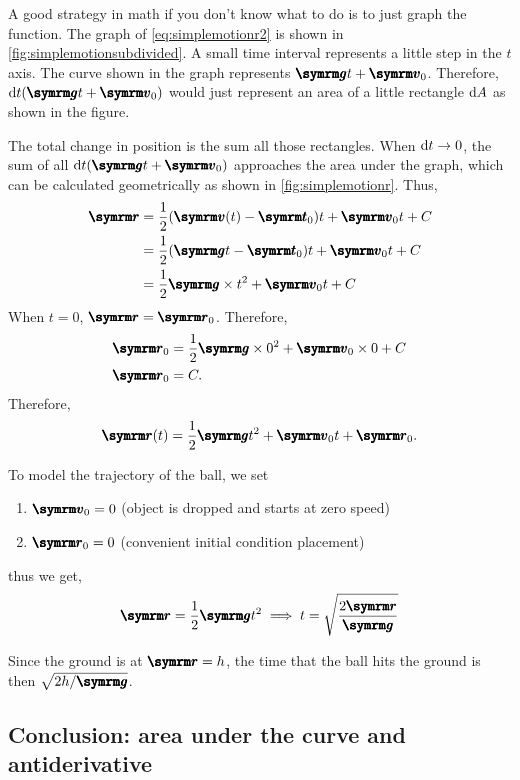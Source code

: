 \begin{multicols}{2}
A good strategy in math if you don't know what to do is to just graph the function. The graph of \cref{eq:simplemotionr2} is shown in \cref{fig:simplemotionsubdivided}. A small time interval represents a little step in the $t$ axis. The curve shown in the graph represents $\vv{g}t + \vv{v}_0$. Therefore, $\odif{t}(\vv{g}t + \vv{v}_0)$ would just represent an area of a little rectangle $\odif{A}$ as shown in the figure.

The total change in position is the sum all those rectangles. When $\odif{t} \appr 0$, the sum of all $\odif{t}(\vv{g}t + \vv{v}_0)$ approaches the area under the graph, which can be calculated geometrically as shown in \cref{fig:simplemotionr}. Thus,
\begin{align}
    \vv{r} &= \frac{1}{2}(\vv{v}(t) - \vv{t}_0)t + \vv{v}_0t + C \\
    &= \frac{1}{2}(\vv{g}t - \vv{t}_0)t + \vv{v}_0t + C \\
    &= \frac{1}{2}\vv{g}\times t^2 + \vv{v}_0t + C
\end{align}
When $t = 0$, $\vv{r} = \vv{r}_0$. Therefore,
\begin{align*}
    \vv{r}_0 &= \frac{1}{2}\vv{g}\times 0^2 + \vv{v}_0\times 0 + C \\
    \vv{r}_0 &= C.
\end{align*}
Therefore,
\begin{equation}
    \vv{r}(t) = \frac{1}{2}\vv{g}t^2 + \vv{v}_0t + \vv{r}_0.
\end{equation}

To model the trajectory of the ball, we set
\begin{enumerate}[noitemsep]
    \item $\vv{v}_0 = 0$ (object is dropped and starts at zero speed)
    \item $\vv{r}_0 = 0$ (convenient initial condition placement)
\end{enumerate}
thus we get,
\begin{gather}
    \vv{r} = \frac{1}{2}\vv{g}t^2 \implies t = \sqrt{\frac{2\vv{r}}{\vv{g}}}
\end{gather}
\end{multicols}
Since the ground is at $\vv{r} = h$, the time that the ball hits the ground is then $\sqrt{2h/\vv{g}}$.

\subsection{Conclusion: area under the curve and antiderivative}

